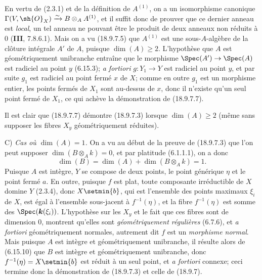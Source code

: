 En vertu de (2.3.1) et de la définition de $A^{(1)}$, on a un isomorphisme canonique $\Gamma(V,\sh{O}_X)\xrightarrow{\sim}B\otimes_A A^{(1)}$, et il suffit donc de prouver que ce dernier anneau est \emph{local}, un tel anneau ne pouvant être le produit de deux anneaux non réduits à 0 (\textbf{III}, 7.8.6.1). Mais on a vu (18.9.7.5) que $A^{(1)}$ est une sous-$A$-algèbre de la clôture intégrale $A'$ de $A$, puisque $\dim(A)\geq 2$. L'hypothèse que $A$ est géométriquement unibranche entraîne que le morphisme $\Spec(A')\to\Spec(A)$ est radiciel au point $y$ (6.15.3); \emph{a fortiori} $g:Y_1\to Y$ est radiciel au point $y$, et par suite $g_1$ est radiciel au point fermé $x$ de $X$; comme en outre $g_1$ est un morphisme entier, les points fermés de $X_1$ sont au-dessus de $x$, donc il n'existe qu'un seul point fermé de $X_1$, ce qui achève la démonstration de (18.9.7.7).

Il est clair que (18.9.7.7) démontre (18.9.7.3) lorsque $\dim(A)\geq 2$ (même sans supposer les fibres $X_y$ géométriquement réduites).

C) \emph{Cas où $\dim(A)=1$.} On a vu au début de la preuve de (18.9.7.3) que l'on peut supposer $\dim(B\otimes_A k)=0$, et par platitude (6.1.1.1), on a donc
\[
  \dim(B)=\dim(A)+\dim(B\otimes_A k)=1.
\]
Puisque $A$ est intègre, $Y$ se compose de deux points, le point générique $\eta$ et le point fermé $a$. En outre, puisque $f$ est plat, toute composante irréductible de $X$ domine $Y$ (2.3.4), donc $X\setmin\{b\}$, qui est l'ensemble des points maximaux $\xi_i$ de $X$, est égal à
l'ensemble sous-jacent à $f^{-1}(\eta)$, et la fibre $f^{-1}(\eta)$ est somme des $\Spec(\boldsymbol{k}(\xi_i))$. L'hypothèse sur les $X_y$ et le fait que ces fibres sont de dimension 0, montrent qu'elles sont \emph{géométriquement régulières} (6.7.6), et \emph{a fortiori} géométriquement normales, autrement dit $f$ est un \emph{morphisme normal}. Mais puisque $A$ est intègre et géométriquement unibranche, il résulte alors de (6.15.10) que $B$ est intègre et géométriquement unibranche, donc $f^{-1}(\eta)=X\setmin\{b\}$ est réduit à un seul point, et \emph{a fortiori} connexe; ceci termine donc la démonstration de (18.9.7.3) et celle de (18.9.7).

